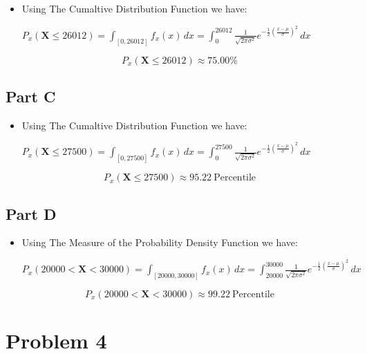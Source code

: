 \documentclass[]{report}
\begin{document}
		\begin{itemize}
			\item Using The Cumaltive Distribution Function we have:
			
				$P_{x} (\mathbf{X} \leq 26012 ) = \int_{[0, 26012] }  f_{x}(x) \, dx =  \int_{0}^{26012}  \frac1{\sqrt{2\pi\sigma^2}}{e}^{- \frac{1}{2} (\frac{x-\mu}{\sigma})^2} \, dx$
				
		\end{itemize}

		$$ P_{x} (\mathbf{X} \leq 26012 ) \approx 75.00\% $$
		
		
	\subsection{Part C}
	
		\begin{itemize}
			\item Using The Cumaltive Distribution Function we have:
			
			$P_{x} (\mathbf{X} \leq 27500 ) = \int_{[0, 27500] }  f_{x}(x) \, dx =  \int_{0}^{27500}  \frac1{\sqrt{2\pi\sigma^2}}{e}^{- \frac{1}{2} (\frac{x-\mu}{\sigma})^2} \, dx$
			
		\end{itemize}
		
		$$ P_{x} (\mathbf{X} \leq 27500 ) \approx 95.22 \ \text{Percentile}$$



	\subsection{Part D}
	
	
		\begin{itemize}
			\item Using The Measure of the Probability Density Function we have:
			
			$P_{x} (20000 < \mathbf{X} < 30000 ) = \int_{[20000, 30000] }  f_{x}(x) \, dx =  \int_{20000}^{30000}  \frac1{\sqrt{2\pi\sigma^2}}{e}^{- \frac{1}{2} (\frac{x-\mu}{\sigma})^2} \, dx$
			
		\end{itemize}
		
		$$ P_{x} (20000 < \mathbf{X} < 30000 ) \approx 99.22 \ \text{Percentile}$$




	\section{Problem 4}
	
\end{document}

